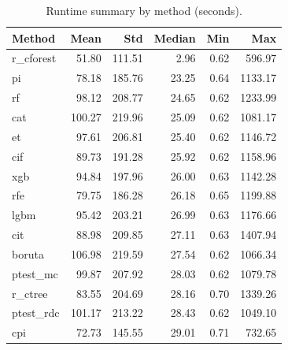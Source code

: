 \begin{table}[h]
\centering
\caption{Runtime summary by method (seconds).}
\label{tab:runtime}
\begin{tabular}{lrrrrr}
\toprule
Method & Mean & Std & Median & Min & Max \\
\midrule
r_cforest & 51.80 & 111.51 & 2.96 & 0.62 & 596.97 \\
pi & 78.18 & 185.76 & 23.25 & 0.64 & 1133.17 \\
rf & 98.12 & 208.77 & 24.65 & 0.62 & 1233.99 \\
cat & 100.27 & 219.96 & 25.09 & 0.62 & 1081.17 \\
et & 97.61 & 206.81 & 25.40 & 0.62 & 1146.72 \\
cif & 89.73 & 191.28 & 25.92 & 0.62 & 1158.96 \\
xgb & 94.84 & 197.96 & 26.00 & 0.63 & 1142.28 \\
rfe & 79.75 & 186.28 & 26.18 & 0.65 & 1199.88 \\
lgbm & 95.42 & 203.21 & 26.99 & 0.63 & 1176.66 \\
cit & 88.98 & 209.85 & 27.11 & 0.63 & 1407.94 \\
boruta & 106.98 & 219.59 & 27.54 & 0.62 & 1066.34 \\
ptest_mc & 99.87 & 207.92 & 28.03 & 0.62 & 1079.78 \\
r_ctree & 83.55 & 204.69 & 28.16 & 0.70 & 1339.26 \\
ptest_rdc & 101.17 & 213.22 & 28.43 & 0.62 & 1049.10 \\
cpi & 72.73 & 145.55 & 29.01 & 0.71 & 732.65 \\
\bottomrule
\end{tabular}
\end{table}